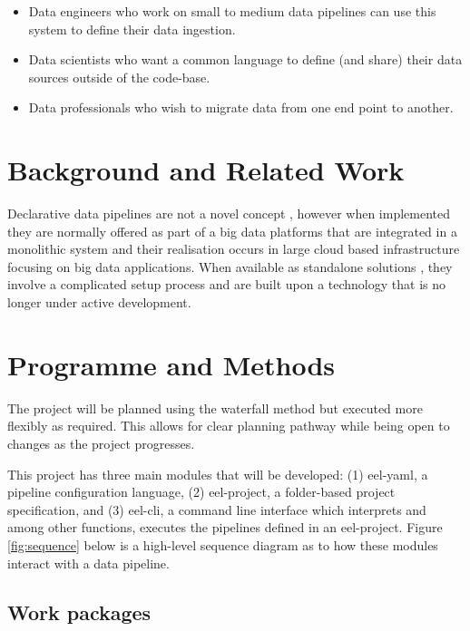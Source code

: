 \begin{itemize}
\tightlist
\item
  Data engineers who work on small to medium data pipelines can use this
  system to define their data ingestion.
\item
  Data scientists who want a common language to define (and share) their
  data sources outside of the code-base.
\item
  Data professionals who wish to migrate data from one end point to
  another.
\end{itemize}

\section{Background and Related Work}\label{background-and-related-work}

Declarative data pipelines are not a novel concept \citep{ingestbase},
however when implemented they are normally offered as part of a big data
platforms that are integrated in a monolithic system
\citep{nifi, ascend} and their realisation occurs in large cloud based
infrastructure focusing on big data applications. When available as
standalone solutions \citep{meltano}, they involve a complicated setup
process and are built upon a technology \citep{singer} that is no longer
under active development.

\section{Programme and Methods}\label{programme-and-methods}

The project will be planned using the waterfall method but executed more
flexibly as required. This allows for clear planning pathway while being
open to changes as the project progresses.

This project has three main modules that will be developed: (1)
eel-yaml, a pipeline configuration language, (2) eel-project, a
folder-based project specification, and (3) eel-cli, a command line
interface which interprets and among other functions, executes the
pipelines defined in an eel-project. Figure \ref{fig:sequence} below is
a high-level sequence diagram as to how these modules interact with a
data pipeline.



\subsection{Work packages}\label{work-packages}

